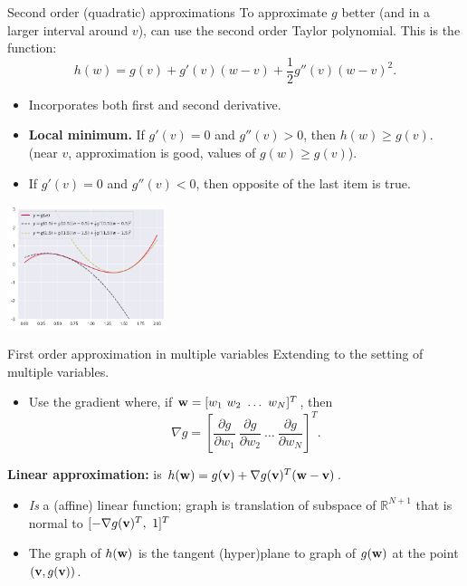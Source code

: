 \documentclass{beamer}
\theoremstyle{example}
\newcommand{\bb}[1]{\mathbb{#1}}
\begin{document}
\begin{frame}{Second order (quadratic) approximations}
    To approximate $g$ better (and in a larger interval around $v$), can use the second order Taylor polynomial. This is the function:
    \[h(w) = g(v) + g'(v)(w - v) + \frac12g''(v)(w - v)^2.\]

    \pause
    \begin{multicols}{2}
    {\footnotesize
    \begin{itemize}
        \item Incorporates both first and second derivative.  
        \pause
        \item {\bf Local minimum.} If $g'(v) = 0$ and $g''(v) > 0$, then $h(w) \ge g(v)$. (near $v$, approximation is good, values of $g(w) \geq g(v)$).
        \pause
        \item If $g'(v) = 0$ and $g''(v) < 0$, then opposite of the last item is true.
    \end{itemize}
    }

    \includegraphics[width=0.35\textwidth]{../../Images/graph-and-quadapproximations.png}
    \end{multicols}
\end{frame}

\begin{frame}{First order approximation in multiple variables}
    Extending to the setting of multiple variables. 
    \begin{itemize}
        \item Use the gradient where, if ${\bf w} = [w_1\ w_2\ \ldots\ w_N]^T$, then 
        \[\nabla g = [\frac{\partial g}{\partial w_1}\ \frac{\partial g}{\partial w_2}\ \ldots\ \frac{\partial g}{\partial w_N}]^T.\]
    \end{itemize}

    \pause
    {\bf Linear approximation:} is $h({\bf w}) = g({\bf v}) + \nabla g({\bf v})^T({\bf w} - {\bf v})$. 
    \begin{itemize}
        \pause
        \item \emph{Is} a (affine) linear function; graph is translation of subspace of $\bb R^{N+1}$ that is normal to $[-\nabla g({\bf v})^T,\ 1]^T$%
        \pause
        \item The graph of $h({\bf w})$ is the tangent (hyper)plane to graph of $g({\bf w})$ at the point $({\bf v}, g({\bf v}))$.
    \end{itemize}
\end{frame}
\end{document}

